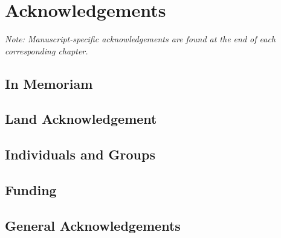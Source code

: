 \chapter*{Acknowledgements}
{}

\textit{Note: Manuscript-specific acknowledgements are found at the end of each corresponding chapter.}

\section*{In Memoriam}
\lipsum[1]

\section*{Land Acknowledgement} 
\lipsum[2]

\section*{Individuals and Groups}
\lipsum[2]

\section*{Funding}
\lipsum[2]

\section*{General Acknowledgements}
\lipsum[2]
